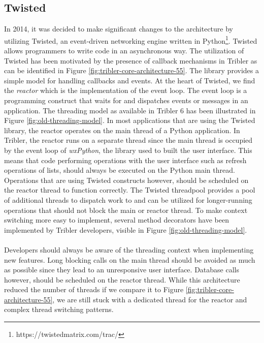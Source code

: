 \subsection{Twisted}
\label{subsec:architecture-twisted}
In 2014, it was decided to make significant changes to the architecture by utilizing Twisted, an event-driven networking engine written in Python\footnote{https://twistedmatrix.com/trac/}. Twisted allows programmers to write code in an asynchronous way. The utilization of Twisted has been motivated by the presence of callback mechanisms in Tribler as can be identified in Figure \ref{fig:tribler-core-architecture-55}. The library provides a simple model for handling callbacks and events. At the heart of Twisted, we find the \emph{reactor} which is the implementation of the event loop\cite{twistedreactoroverview}. The event loop is a programming construct that waits for and dispatches events or messages in an application.
The threading model as available in Tribler 6 has been illustrated in Figure \ref{fig:old-threading-model}. In most applications that are using the Twisted library, the reactor operates on the main thread of a Python application. In Tribler, the reactor runs on a separate thread since the main thread is occupied by the event loop of \emph{wxPython}, the library used to built the user interface. This means that code performing operations with the user interface such as refresh operations of lists, should always be executed on the Python main thread. Operations that are using Twisted constructs however, should be scheduled on the reactor thread to function correctly. The Twisted threadpool provides a pool of additional threads to dispatch work to and can be utilized for longer-running operations that should not block the main or reactor thread. To make context switching more easy to implement, several method decorators have been implemented by Tribler developers, visible in Figure \ref{fig:old-threading-model}.\\\\
Developers should always be aware of the threading context when implementing new features. Long blocking calls on the main thread should be avoided as much as possible since they lead to an unresponsive user interface. Database calls however, should be scheduled on the reactor thread. While this architecture reduced the number of threads if we compare it to Figure \ref{fig:tribler-core-architecture-55}, we are still stuck with a dedicated thread for the reactor and complex thread switching patterns.

